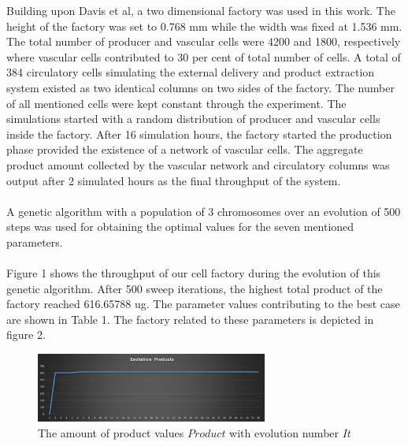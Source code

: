 Building upon Davis et al, a two dimensional factory was used in this work. The height of the factory was set to 0.768 mm while the width was fixed at 1.536 mm. The total number of producer and vascular cells were 4200 and 1800, respectively where vascular cells contributed to 30 per cent of total number of cells. A total of 384 circulatory cells simulating the external delivery and product extraction system existed as two identical columns on two sides of the factory. The number of all mentioned cells were kept constant through the experiment. The simulations started with a random distribution of producer and vascular cells inside the factory. After 16 simulation hours, the factory started the production phase provided the existence of a network of vascular cells. The aggregate product amount collected by the vascular network and circulatory columns was output after 2 simulated hours as the final throughput of the system. 
\\
\\
A genetic algorithm with a population of 3 chromosomes over an evolution of 500 steps was used for obtaining the optimal values for the seven mentioned parameters. 
\\
\\
Figure 1 shows the throughput of our cell factory during the evolution of this genetic algorithm. After 500 sweep iterations, the highest total product of the factory reached 616.65788 ug. The parameter values contributing to the best case are shown in Table 1. The factory related to these parameters is depicted in figure 2. 

\begin{figure}[!t]
\centering
\includegraphics[width=3in]{./figures/sima/results/evolution products.png}

\caption{The amount of product values $Product$ with evolution number $It$}
\label{product}
\end{figure}          

